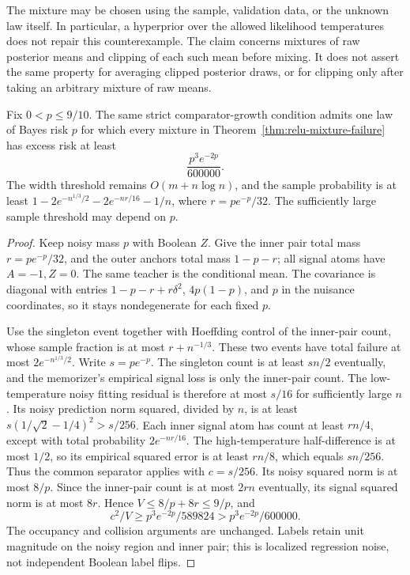 The mixture may be chosen using the sample, validation data, or the
unknown law itself. In particular, a hyperprior over the allowed
likelihood temperatures does not repair this counterexample. The
claim concerns mixtures of raw posterior means and clipping of each
such mean before mixing. It does not assert the same property for
averaging clipped posterior draws, or for clipping only after taking
an arbitrary mixture of raw means.


\begin{corollary}
Fix $0<p\le9/10$. The same strict comparator-growth condition admits
one law of Bayes risk $p$ for which every mixture in
Theorem~\ref{thm:relu-mixture-failure} has excess risk at least
\[
 \frac{p^3e^{-2p}}{600000}.
\]
The width threshold remains $O(m+n\log n)$, and the sample probability
is at least
$1-2e^{-n^{1/3}/2}-2e^{-nr/16}-1/n$, where $r=pe^{-p}/32$.
The sufficiently large sample threshold may depend on $p$.
\end{corollary}
\begin{proof}
Keep noisy mass $p$ with Boolean $Z$. Give the inner pair total mass
$r=pe^{-p}/32$, and the outer anchors total mass $1-p-r$; all signal
atoms have $A=-1,Z=0$. The same teacher is the conditional mean.
The covariance is diagonal with entries
$1-p-r+r\delta^2$, $4p(1-p)$, and $p$ in the nuisance coordinates,
so it stays nondegenerate for each fixed $p$.

Use the singleton event together with Hoeffding control of the
inner-pair count, whose sample fraction is at most $r+n^{-1/3}$.
These two events have total failure at most $2e^{-n^{1/3}/2}$.
Write $s=pe^{-p}$. The singleton count is at least $sn/2$ eventually,
and the memorizer's empirical signal loss is only the inner-pair
count. The low-temperature noisy fitting residual is therefore at
most $s/16$ for sufficiently large $n$. Its noisy prediction norm
squared, divided by $n$, is at least
$s(1/\sqrt2-1/4)^2>s/256$.
Each inner signal atom has count at least $rn/4$, except with total
probability $2e^{-nr/16}$. The high-temperature half-difference is
at most $1/2$, so its empirical squared error is at least $rn/8$,
which equals $sn/256$.
Thus the common separator applies with $c=s/256$.
Its noisy squared norm is at most $8/p$. Since the inner-pair count
is at most $2rn$ eventually, its signal squared norm is at most
$8r$. Hence $V\le8/p+8r\le9/p$, and
\[
 c^2/V\ge p^3e^{-2p}/589824>p^3e^{-2p}/600000.
\]
The occupancy and collision arguments are unchanged. Labels retain
unit magnitude on the noisy region and inner pair; this is localized
regression noise, not independent Boolean label flips.
\end{proof}
